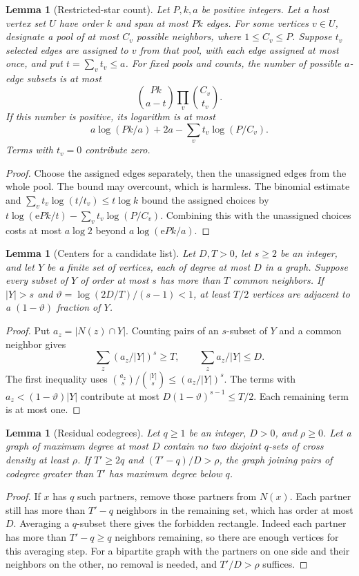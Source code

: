 \documentclass[11pt]{amsart}
\newtheorem{lemma}[theorem]{Lemma}
\theoremstyle{definition}
\theoremstyle{remark}
\numberwithin{equation}{section}
\newcommand{\e}{\mathrm e}
\begin{document}
\begin{lemma}[Restricted-star count]\label{lem:restricted-star}
Let $P,k,a $ be positive integers. Let a host vertex set $ U $ have order $ k$
and span at most $Pk $ edges. For some vertices $ v\in U$, designate a pool
of at most $C_v $ possible neighbors, where $1\le C_v\le P$.
Suppose $t_v $ selected edges are assigned to $ v$ from that pool, with each
edge assigned at most once, and put $t=\sum_v t_v\le a$.
For fixed pools and counts, the number of possible $a$-edge subsets is at most
\[
 \binom{Pk}{a-t}\prod_v\binom{C_v}{t_v}.
\]
If this number is positive, its logarithm is at most
\[
 a\log(Pk/a)+2a-\sum_v t_v\log(P/C_v).
\]
Terms with $t_v=0$ contribute zero.
\end{lemma}
\begin{proof}
Choose the assigned edges separately, then the unassigned edges from
the whole pool. The bound may overcount, which is harmless.
The binomial estimate and
$\sum_vt_v\log(t/t_v)\le t\log k$ bound the assigned choices by
$t\log(\e Pk/t)-\sum_vt_v\log(P/C_v)$.
Combining this with the unassigned choices costs at most $a\log2$
beyond $a\log(\e Pk/a)$.
\end{proof}

\begin{lemma}[Centers for a candidate list]\label{lem:centers}
Let $D,T>0$, let $ s\ge2$ be an integer, and let $ Y$ be a finite set of
vertices, each of degree at most $D$ in a graph. Suppose every subset
of $Y $ of order at most $ s$ has more than
$T $ common neighbors. If $|Y|>s$ and
$\vartheta=\log(2D/T)/(s-1)<1$, at least $ T/2$ vertices are adjacent
to a $(1-\vartheta)$ fraction of $ Y$.
\end{lemma}
\begin{proof}
Put $a_z=|N(z)\cap Y|$. Counting pairs of an $ s $-subset of $ Y$ and a
common neighbor gives
\[
 \sum_z(a_z/|Y|)^s\ge T,
 \qquad \sum_z a_z/|Y|\le D.
\]
The first inequality uses
$\binom{a_z}{s}/\binom{|Y|}{s}\le(a_z/|Y|)^s$.
The terms with $a_z<(1-\vartheta)|Y|$ contribute at most
$D(1-\vartheta)^{s-1}\le T/2$. Each remaining term is at most one.
\end{proof}

\begin{lemma}[Residual codegrees]\label{lem:codegree}
Let $q\ge1$ be an integer, $ D>0$, and $\rho\ge0$. Let a graph of
maximum degree at most $D$ contain no two disjoint
$q $-sets of cross density at least $\rho $. If $ T'\ge2q$ and
$(T'-q)/D>\rho $, the graph joining pairs of codegree greater than $ T'$
has maximum degree below $q$.
\end{lemma}
\begin{proof}
If $x $ has $ q $ such partners, remove those partners from $ N(x)$.
Each partner still has more than $T'-q$ neighbors in the remaining
set, which has order at most $D $. Averaging a $ q$-subset there gives
the forbidden rectangle. Indeed each partner has more than
$T'-q\ge q$ neighbors remaining, so there are enough vertices for
this averaging step. For a bipartite graph with the partners on one
side and their neighbors on the other, no removal is needed, and
$T'/D>\rho$ suffices.
\end{proof}
\end{document}
